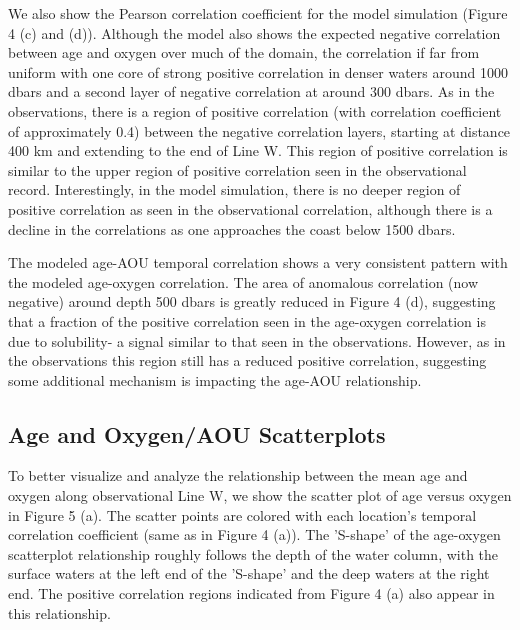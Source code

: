 We also show the Pearson correlation coefficient for the model simulation (Figure 4 (c) and (d)). Although the model also shows the expected negative correlation between age and oxygen over much of the domain, the correlation if far from uniform with one core of strong positive correlation in denser waters around 1000 dbars and a second layer of negative correlation at around 300 dbars.  As in the observations, there is a region of positive correlation (with correlation coefficient of approximately 0.4) between the negative correlation layers, starting at distance 400 km and extending to the end of Line W. This region of positive correlation is similar to the upper region of positive correlation seen in the observational record. Interestingly, in the model simulation, there is no deeper region of positive correlation as seen in the observational correlation, although there is a decline in the correlations as one approaches the coast below 1500 dbars.

The modeled age-AOU temporal correlation shows a very consistent pattern with the modeled age-oxygen correlation. The area of anomalous correlation (now negative) around depth 500 dbars is greatly reduced in Figure 4 (d), suggesting that a fraction of the positive correlation seen in the age-oxygen correlation is due to solubility- a signal similar to that seen in the observations. However, as in the observations this region still has a reduced positive correlation, suggesting some additional mechanism is impacting the age-AOU relationship.

\subsection{Age and Oxygen/AOU Scatterplots}

To better visualize and analyze the relationship between the mean age and oxygen along observational Line W, we show the scatter plot of age versus oxygen in Figure 5 (a). The scatter points are colored with each location's temporal correlation coefficient (same as in Figure 4 (a)). The 'S-shape' of the age-oxygen scatterplot relationship roughly follows the depth of the water column, with the surface waters at the left end of the 'S-shape' and the deep waters at the right end. The positive correlation regions indicated from Figure 4 (a) also appear in this relationship.

